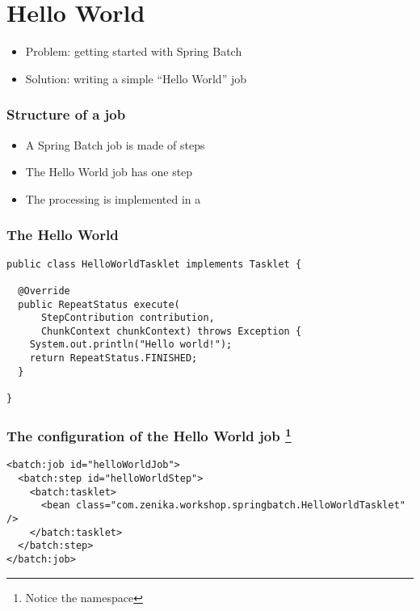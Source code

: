 \section{Hello World}

\begin{frame}
 \begin{itemize}
  \item Problem: getting started with Spring Batch
  \item Solution: writing a simple ``Hello World'' job
 \end{itemize}
\end{frame}

\begin{frame}
 \frametitle{Structure of a job}
 \begin{itemize}
  \item A Spring Batch job is made of steps
  \item The Hello World job has one step
  \item The processing is implemented in a 
 \end{itemize}
\end{frame}

\begin{frame}[fragile]
\frametitle{The Hello World }
\lstset{language=Java}
\begin{lstlisting}
public class HelloWorldTasklet implements Tasklet {

  @Override
  public RepeatStatus execute(
      StepContribution contribution,
      ChunkContext chunkContext) throws Exception {
    System.out.println("Hello world!");
    return RepeatStatus.FINISHED;
  }

}
\end{lstlisting}
\end{frame}

\begin{frame}[fragile]
\frametitle{The configuration of the Hello World job \footnote{Notice the 
namespace}}
\lstset{language=XML}
\begin{lstlisting}
<batch:job id="helloWorldJob">
  <batch:step id="helloWorldStep">
    <batch:tasklet>
      <bean class="com.zenika.workshop.springbatch.HelloWorldTasklet" />
    </batch:tasklet>
  </batch:step>
</batch:job>
\end{lstlisting}
\end{frame}

